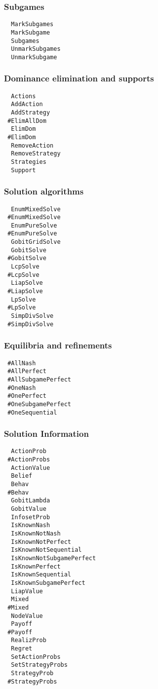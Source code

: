 \subsubsection{Subgames}

\begin{verbatim}
  MarkSubgames 
  MarkSubgame 
  Subgames 
  UnmarkSubgames 
  UnmarkSubgame 
\end{verbatim}

\subsubsection{Dominance elimination and supports}

\begin{verbatim}
  Actions
  AddAction
  AddStrategy
 #ElimAllDom 
  ElimDom 
 #ElimDom 
  RemoveAction
  RemoveStrategy
  Strategies 
  Support 
\end{verbatim}

\subsubsection{Solution algorithms}

\begin{verbatim}
  EnumMixedSolve 
 #EnumMixedSolve 
  EnumPureSolve 
 #EnumPureSolve 
  GobitGridSolve 
  GobitSolve 
 #GobitSolve 
  LcpSolve 
 #LcpSolve 
  LiapSolve 
 #LiapSolve 
  LpSolve 
 #LpSolve 
  SimpDivSolve 
 #SimpDivSolve 
\end{verbatim}

\subsubsection{Equilibria and refinements}

\begin{verbatim}
 #AllNash
 #AllPerfect
 #AllSubgamePerfect
 #OneNash
 #OnePerfect
 #OneSubgamePerfect
 #OneSequential
\end{verbatim}

\subsubsection{Solution Information}

\begin{verbatim}
  ActionProb 
 #ActionProbs 
  ActionValue 
  Belief 
  Behav 
 #Behav 
  GobitLambda 
  GobitValue 
  InfosetProb 
  IsKnownNash 
  IsKnownNotNash 
  IsKnownNotPerfect 
  IsKnownNotSequential 
  IsKnownNotSubgamePerfect 
  IsKnownPerfect 
  IsKnownSequential 
  IsKnownSubgamePerfect 
  LiapValue 
  Mixed
 #Mixed
  NodeValue 
  Payoff 
 #Payoff 
  RealizProb 
  Regret 
  SetActionProbs 
  SetStrategyProbs 
  StrategyProb 
 #StrategyProbs 
\end{verbatim}


